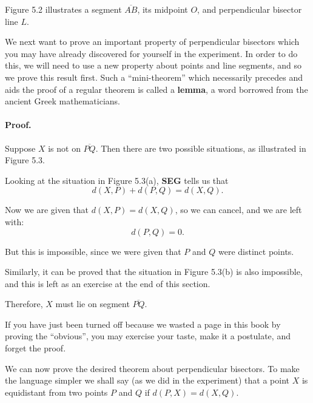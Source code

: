 \documentclass[12pt]{book} %
\begin{document}

Figure 5.2 illustrates a segment $\overline{AB}$, its midpoint $O$, and perpendicular bisector line $L$.

We next want to prove an important property of perpendicular bisectors which you may have already discovered for yourself in the experiment. In order to do this, we will need to use a new property about points and line segments, and so we prove this result first. Such a ``mini-theorem'' which necessarily precedes and aids the proof of a regular theorem is called a \textbf{lemma}, a word borrowed from the ancient Greek mathematicians.


\paragraph{Proof.}
Suppose $X$ is not on $\overline{PQ}$. Then there are two possible situations, as illustrated in Figure 5.3.


Looking at the situation in Figure 5.3(a), \textbf{SEG} tells us that
\[
d(X,P)+d(P,Q)=d(X,Q).
\]

Now we are given that $d(X,P)=d(X,Q)$, so we can cancel, and we are left with:
\[
d(P,Q)=0.
\]

But this is impossible, since we were given that $P$ and $Q$ were distinct points.

Similarly, it can be proved that the situation in Figure 5.3(b) is also impossible, and this is left as an exercise at the end of this section.

Therefore, $X$ must lie on segment $\overline{PQ}$.

If you have just been turned off because we wasted a page in this book by proving the ``obvious'', you may exercise your taste, make it a postulate, and forget the proof.

We can now prove the desired theorem about perpendicular bisectors. To make the language simpler we shall say (as we did in the experiment) that a point $X$ is equidistant from two points $P$ and $Q$ if $d(P,X)=d(X,Q)$.

\end{document}
